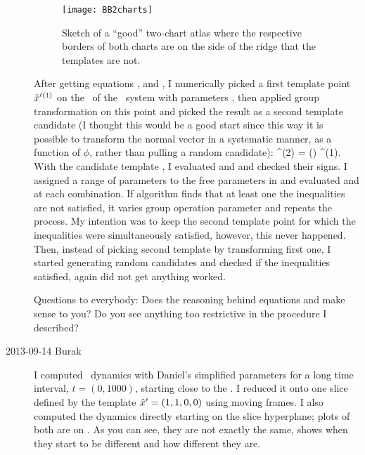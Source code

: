 \begin{description}
\begin{figure}
\begin{center}
  \texttt{[image: BB2charts]}
\end{center}
  \caption{Sketch of a ``good'' two-chart atlas where the respective borders of both charts are on the side of the ridge that the templates are not.}
\label{fig:BB2charts}
\end{figure}
After getting equations ,  and , I numerically picked a first template point ${\hat{x}'}{}^{(1)}$ on the \reqv\ of the \twoMode\ system with parameters , then applied group transformation on this point and picked the result as a second template candidate (I thought this would be a good start since this way it is possible to transform the normal vector in a systematic manner, as a function of $\phi$, rather than pulling a random candidate):
\beq
	\slicep{}^{(2)} = \LieEl (\phi) \slicep{}^{(1)}.
	\label{eq:slicepcandidate}
\eeq
With the candidate template , I evaluated  and  and checked their signs. I assigned a range of parameters to the free parameters in  and evaluated  and  at each combination. If algorithm finds that at least one the inequalities are not satisfied, it varies group operation parameter and repeats the process. My intention was to keep the second template point for which the inequalities were simultaneously satisfied, however, this never happened. Then, instead of picking second template by transforming first one, I started generating random candidates and checked if the inequalities satisfied, again did not get anything worked.

Questions to everybody: Does the reasoning behind equations  and  make sense to you? Do you see anything too restrictive in the procedure I described?

\item[2013-09-14 Burak] I computed \twoMode\ dynamics with Daniel's simplified parameters  for a long time interval,
$t = (0,1000)$, starting close to the \reqv.
 I reduced it onto one slice defined by the template ${\hat{x}'} = (1,1,0,0)$ using moving frames. I also computed the dynamics directly starting on the slice hyperplane; plots of both are on . As you can see, they are not exactly the same,  shows when they start to be different and how different they are.


\end{description}
